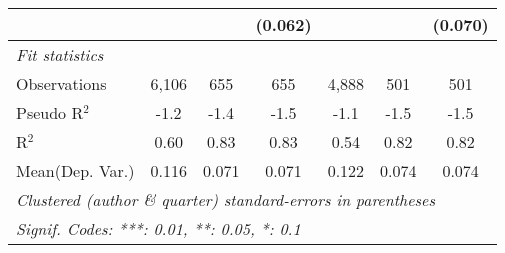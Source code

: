 \begin{tabular}{lcccccc}
                                  &              &                & (0.062)        &         &                & (0.070)\\   
   \midrule
   \emph{Fit statistics}\\
   Observations                   & 6,106        & 655            & 655            & 4,888   & 501            & 501\\  
   Pseudo R$^2$                   & -1.2         & -1.4           & -1.5           & -1.1    & -1.5           & -1.5\\  
   R$^2$                          & 0.60         & 0.83           & 0.83           & 0.54    & 0.82           & 0.82\\  
Mean(Dep. Var.) & 0.116 & 0.071 & 0.071 & 0.122 & 0.074 & 0.074 \\
   \midrule \midrule
   \multicolumn{7}{l}{\emph{Clustered (author \& quarter) standard-errors in parentheses}}\\
   \multicolumn{7}{l}{\emph{Signif. Codes: ***: 0.01, **: 0.05, *: 0.1}}\\
\end{tabular}
\par\endgroup
